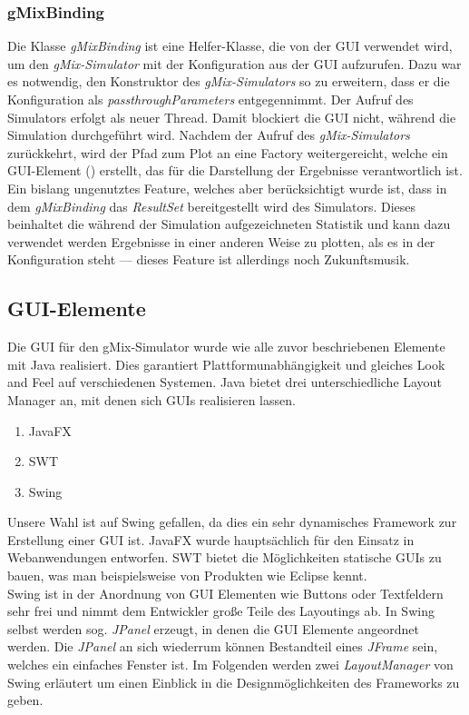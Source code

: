 \documentclass[a4paper, 11pt]{article} %
\begin{document}
\subsubsection{gMixBinding} %
\label{ssub:gmixbinding}
Die Klasse \emph{gMixBinding} ist eine Helfer-Klasse, die von der GUI verwendet wird, um den \emph{gMix-Simulator} mit der Konfiguration aus der GUI aufzurufen. Dazu war es notwendig, den Konstruktor des \emph{gMix-Simulators} so zu erweitern, dass er die Konfiguration als \emph{passthroughParameters} entgegennimmt. Der Aufruf des Simulators erfolgt als neuer Thread. Damit blockiert die GUI nicht, während die Simulation durchgeführt wird. Nachdem der Aufruf des \emph{gMix-Simulators} zurückkehrt, wird der Pfad zum Plot an eine Factory weitergereicht, welche ein GUI-Element (\emph{}) erstellt, das für die Darstellung der Ergebnisse verantwortlich ist.\\

Ein bislang ungenutztes Feature, welches aber berücksichtigt wurde ist, dass in dem \emph{gMixBinding} das \emph{ResultSet} bereitgestellt wird des Simulators. Dieses beinhaltet die während der Simulation aufgezeichneten Statistik und kann dazu verwendet werden Ergebnisse in einer anderen Weise zu plotten, als es in der Konfiguration steht --- dieses Feature ist allerdings noch Zukunftsmusik.\\

\subsection{GUI-Elemente}
Die GUI für den gMix-Simulator wurde wie alle zuvor beschriebenen Elemente mit Java realisiert. Dies garantiert Plattformunabhängigkeit und gleiches Look and Feel auf verschiedenen Systemen. Java bietet drei unterschiedliche Layout Manager an, mit denen sich GUIs realisieren lassen.
\begin{enumerate}
\item JavaFX
\item SWT
\item Swing
\end{enumerate}
Unsere Wahl ist auf Swing gefallen, da dies ein sehr dynamisches Framework zur Erstellung einer GUI ist. JavaFX wurde hauptsächlich für den Einsatz in Webanwendungen entworfen. SWT bietet die Möglichkeiten statische GUIs zu bauen, was man beispielsweise von Produkten wie  Eclipse kennt.\\
Swing ist in der Anordnung von GUI Elementen wie Buttons oder Textfeldern sehr frei und nimmt dem Entwickler große Teile des Layoutings ab. In Swing selbst werden sog. \emph{JPanel} erzeugt, in denen die GUI Elemente angeordnet werden. Die \emph{JPanel} an sich wiederrum können Bestandteil eines \emph{JFrame} sein, welches ein einfaches Fenster ist. Im Folgenden werden zwei \emph{LayoutManager} von Swing erläutert um einen Einblick in die Designmöglichkeiten des Frameworks zu geben.
\end{document}
